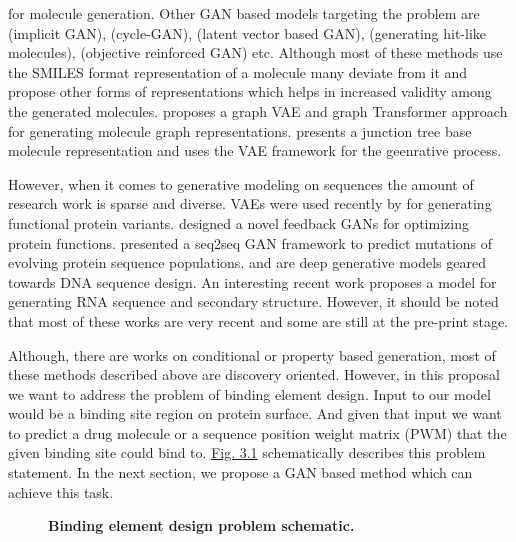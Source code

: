 for molecule generation. Other GAN based models
targeting the problem are \citep{de2018molgan} (implicit GAN), \citep{maziarka2020mol} (cycle-GAN), \citet{prykhodko2019novo} (latent vector based GAN), 
\citet{mendez2020novo} (generating hit-like molecules), \citet{guimaraes2017objective} (objective
reinforced GAN) etc. Although most of these methods use the SMILES format representation of a
molecule many deviate from it and propose other forms of representations which helps in increased
validity among the generated molecules. \citet{mitton2021graph} proposes a graph VAE and graph
Transformer \citep{vaswani2017attention} approach for generating molecule graph representations.
\citet{jin2018junction} presents a junction tree base molecule representation and uses the VAE
framework for the geenrative process.
\par
However, when it comes to generative modeling on sequences the amount of research work is sparse and
diverse. VAEs were used recently by \citet{hawkins2021generating} for generating functional protein
variants. \citet{gupta2018feedback} designed a novel feedback GANs for optimizing protein functions.
\citet{berman2020mutagan} presented a seq2seq GAN framework to predict mutations of evolving protein
sequence populations. \citet{linder2020generative} and \citet{killoran2017generating} are deep
generative models geared towards DNA sequence design. An interesting recent work
\citet{yan2021neural} proposes a model for generating RNA sequence and secondary structure. However,
it should be noted that most of these works are very recent and some are still at the pre-print
stage. 
\par
Although, there are works on conditional or property based generation, most of these methods
described above are discovery oriented. However, in this proposal we want to address the problem of
binding element design. Input to our model would be a binding site region on protein surface. And
given that input we want to predict a drug molecule or a sequence position weight matrix (PWM) that
the given binding site could bind to. \hyperref[fig:design_problem]{Fig. 3.1} schematically
describes this problem statement. In the next section, we propose a GAN based method which can
achieve this task.
\begin{center}\begin{figure}
        \caption[Binding element design problem schematic]{\textbf{Binding element design problem
        schematic.}}
        \label{fig:design_problem} \end{figure} \end{center}

